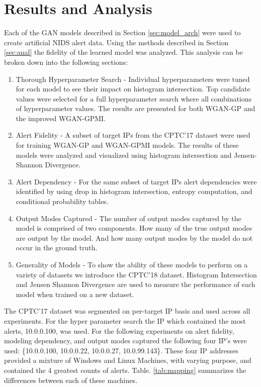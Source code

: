 \chapter{Results and Analysis}
\label{sec:rna}


Each of the GAN models described in Section \ref{sec:model_arch} were used to create artificial NIDS alert data.  Using the methods described in Section \ref{sec:anal} the fidelity of the learned model was analyzed. This analysis can be broken down into the following sections:

\begin{enumerate}
	\item Thorough Hyperparameter Search - Individual hyperparameters were tuned for each model to see their impact on histogram intersection. Top candidate values were selected for a full hyperparameter search where all combinations of hyperparameter values. The results are presented for both WGAN-GP and the improved WGAN-GPMI.

	\item Alert Fidelity - A subset of target IPs from the CPTC'17 dataset were used for training WGAN-GP and WGAN-GPMI models. The results of these models were analyzed and visualized using histogram intersection and Jensen-Shannon Divergence.

	\item Alert Dependency - For the same subset of target IPs alert dependencies were identified by using drop in histogram intersection, entropy computation, and conditional probability tables.

	\item Output Modes Captured - The number of output modes captured by the model is comprised of two components. How many of the true output modes are output by the model. And how many output modes by the model do not occur in the ground truth.
	
	\item Generality of Models - To show the ability of these models to perform on a variety of datasets we introduce the CPTC'18 dataset. Histogram Intersection and Jensen Shannon Divergence are used to measure the performance of each model when trained on a new dataset. 

\end{enumerate}

The CPTC'17 dataset was segmented on per-target IP basis and used across all experiments. For the hyper parameter search the IP which contained the most alerts, 10.0.0.100, was used. For the following experiments on alert fidelity, modeling dependency, and output modes captured the following four IP's were used: \{10.0.0.100, 10.0.0.22, 10.0.0.27, 10.0.99.143\}. These four IP addresses provided a mixture of Windows and Linux Machines, with varying purpose, and contained the 4 greatest counts of alerts. Table. \ref{tab:mapping} summarizes the differences between each of these machines.

